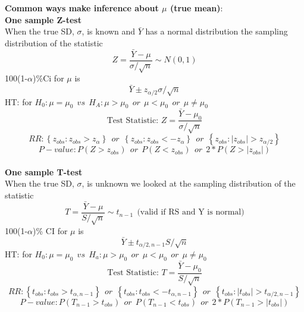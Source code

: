 \Large\textbf{Common ways make inference about $\mu$ (true mean)}:\large\\
\textbf{One sample Z-test}\\
When the true SD, $\sigma$, is known and $\bar{Y}$ has a normal distribution the sampling distribution of the statistic\\
$$Z=\frac{\bar{Y}-\mu}{\sigma/\sqrt{n}} \sim N(0,1)$$
100(1-$\alpha$)\%Ci for $\mu$ is
$$\bar{Y}\pm z_{\alpha/2}\sigma/\sqrt{n}$$
HT: for $H_0:\mu=\mu_0~~vs~~H_A: \mu>\mu_0~~or~~\mu<\mu_0~~or~~\mu\neq\mu_0$
$$\mbox{Test Statistic: }Z=\frac{\bar{Y}-\mu_0}{\sigma/\sqrt{n}}$$
$$RR: \left\{z_{obs}:z_{obs}>z_{\alpha}\right\}~~or~~\left\{z_{obs}:z_{obs}<-z_{\alpha}\right\}~~or~~\left\{z_{obs}:|z_{obs}|>z_{\alpha/2}\right\}$$
$$P-value: P(Z>z_{obs})~~or~~P(Z<z_{obs})~~or~~2*P(Z>|z_{obs}|)$$
~\\

\textbf{One sample T-test}\\
When the true SD, $\sigma$, is unknown we looked at the sampling distribution of the statistic\\
$$T=\frac{\bar{Y}-\mu}{S/\sqrt{n}} \sim t_{n-1}~~\mbox{(valid if RS and Y is normal)}$$
100(1-$\alpha$)\% CI for $\mu$ is
$$\bar{Y}\pm t_{\alpha/2,n-1}S/\sqrt{n}$$
HT: for $H_0:\mu=\mu_0~~vs~~H_a: \mu>\mu_0~~or~~\mu<\mu_0~~or~~\mu\neq\mu_0$
$$\mbox{Test Statistic: } T=\frac{\bar{Y}-\mu_0}{S/\sqrt{n}}$$
$$RR: \left\{t_{obs}:t_{obs}>t_{\alpha,n-1}\right\}~~or~~\left\{t_{obs}:t_{obs}<-t_{\alpha,n-1}\right\}~~or~~\left\{t_{obs}:|t_{obs}|>t_{\alpha/2,n-1}\right\}$$
$$P-value: P(T_{n-1}>t_{obs})~~or~~P(T_{n-1}<t_{obs})~~or~~2*P(T_{n-1}>|t_{obs}|)$$
~\\

\newpage

